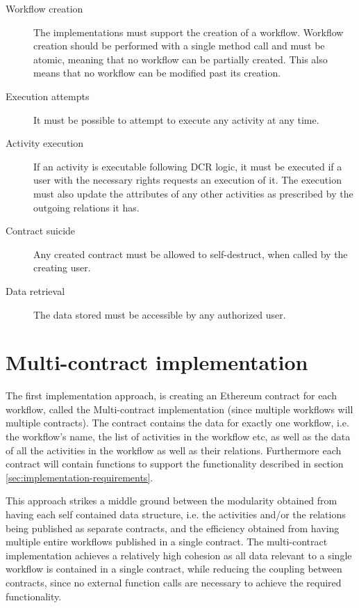 \documentclass{article}
\begin{document}
	\begin{description}
		\item[Workflow creation] The implementations must support the creation of a workflow. Workflow creation should be performed with a single method call and must be atomic, meaning that no workflow can be partially created. This also means that no workflow can be modified past its creation.
		\item[Execution attempts] It must be possible to attempt to execute any activity at any time.
		\item[Activity execution] If an activity is executable following DCR logic, it must be executed if a user with the necessary rights requests an execution of it. The execution must also update the attributes of any other activities as prescribed by the outgoing relations it has.
		\item[Contract suicide] Any created contract must be allowed to self-destruct, when called by the creating user.
		\item[Data retrieval] The data stored must be accessible by any authorized user.
	\end{description}

	\section{Multi-contract implementation}
	The first implementation approach, is creating an Ethereum contract for each workflow, called the Multi-contract implementation (since multiple workflows will multiple contracts). 
	The contract contains the data for exactly one workflow, i.e. the workflow's name, the list of activities in the workflow etc, as well as the data of all the activities in the workflow as well as their relations. 
	Furthermore each contract will contain functions to support the functionality described in section \ref{sec:implementation-requirements}.

	This approach strikes a middle ground between the modularity obtained from having each self contained data structure, i.e. the activities and/or the relations being published as separate contracts, and the efficiency obtained from having multiple entire workflows published in a single contract. 
	The multi-contract implementation achieves a relatively high cohesion as all data relevant to a single workflow is contained in a single contract, while reducing the coupling between contracts, since no external function calls are necessary to achieve the required functionality.
\end{document}
